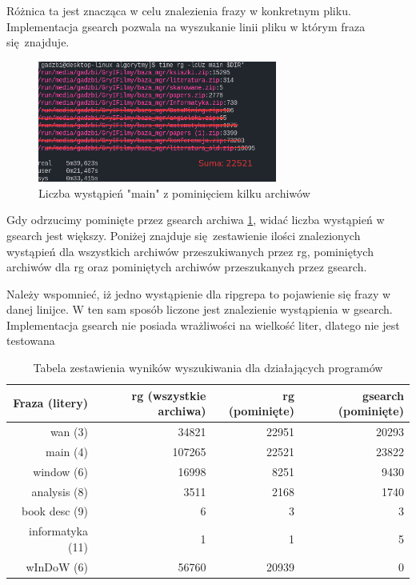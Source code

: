 Różnica ta jest znacząca w celu znalezienia frazy w konkretnym pliku. 
Implementacja gsearch pozwala na wyszukanie linii pliku w którym fraza się znajduje. 

\begin{figure}[h]
\centering
\includegraphics[width=0.7\textwidth]{./images/rgSkippedmain.png}
\caption{Liczba wystąpień "main" z pominięciem kilku archiwów}
\label{fig:ripgrepRemoveSkipped}
\end{figure}

Gdy odrzucimy pominięte przez gsearch archiwa \ref{fig:ripgrepRemoveSkipped},
widać liczba wystąpień w gsearch jest większy. Poniżej znajduje się zestawienie
ilości znalezionych wystąpień dla wszystkich archiwów przeszukiwanych przez rg,
pominiętych archiwów dla rg oraz pominiętych archiwów przeszukanych przez gsearch.

Należy wspomnieć, iż jedno wystąpienie dla ripgrepa to pojawienie się frazy
w danej linijce. W ten sam sposób liczone jest znalezienie wystąpienia w gsearch.
Implementacja gsearch nie posiada wrażliwości na wielkość liter, dlatego nie 
jest testowana

\begin{table}[h]
    \centering
    \begin{tabular}{|r|r|r|r|}
        \hline
        \textbf{Fraza (litery)} & \textbf{rg (wszystkie archiwa)} & \textbf{rg (pominięte)} &  \textbf{gsearch (pominięte)} \\
        \hline
        wan (3) & 34821 & 22951 & 20293 \\
        \hline
        main (4) & 107265 & 22521 & 23822 \\
        \hline
        window (6) & 16998 & 8251 & 9430 \\
        \hline
        analysis (8) & 3511 & 2168 & 1740 \\
        \hline
        book desc (9) & 6 & 3 & 3 \\
        \hline
        informatyka (11) & 1 & 1 & 5 \\
        \hline
        wInDoW (6) & 56760 & 20939 & 0 \\
        \hline
    \end{tabular}
    \caption{Tabela zestawienia wyników wyszukiwania dla działających programów}
    \label{tabela:iloscWyszukanDziekiProgramom}
\end{table}

